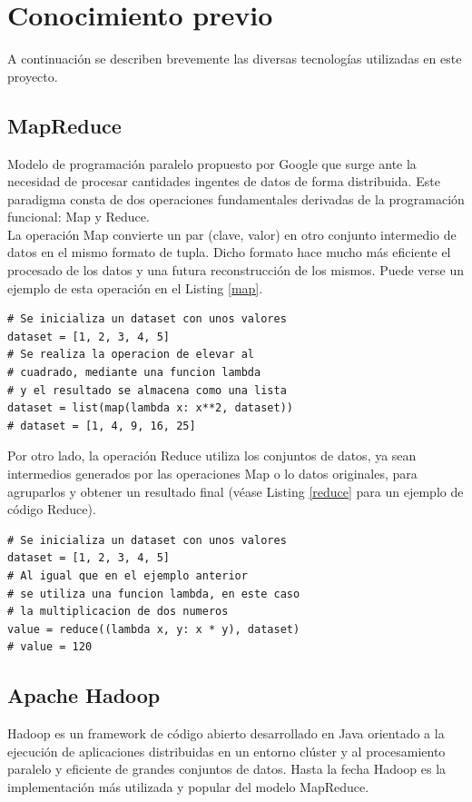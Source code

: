 \documentclass[conference]{IEEEtran}
\begin{document}
\section{Conocimiento previo}

A continuación se describen brevemente las diversas tecnologías utilizadas en este proyecto.

\subsection{MapReduce}
Modelo de programación paralelo propuesto por Google\cite{mapreduce} que surge ante la necesidad de procesar cantidades ingentes de datos de forma distribuida. Este paradigma consta de dos operaciones fundamentales derivadas de la programación funcional: Map y Reduce.\\

La operación Map convierte un par (clave, valor) en otro conjunto intermedio de datos en el mismo formato de tupla. Dicho formato hace mucho más eficiente el procesado de los datos y una futura reconstrucción de los mismos. Puede verse un ejemplo de esta operación en el Listing \ref{map}.\\

\begin{lstlisting}[style=pythonStyle, caption=Ejemplo de operación Map, label=map]
# Se inicializa un dataset con unos valores
dataset = [1, 2, 3, 4, 5]
# Se realiza la operacion de elevar al 
# cuadrado, mediante una funcion lambda
# y el resultado se almacena como una lista
dataset = list(map(lambda x: x**2, dataset))
# dataset = [1, 4, 9, 16, 25]
\end{lstlisting}

Por otro lado, la operación Reduce utiliza los conjuntos de datos, ya sean intermedios generados por las operaciones Map o lo datos originales, para agruparlos y obtener un resultado final (véase Listing \ref{reduce} para un ejemplo de código Reduce).

\begin{lstlisting}[style=pythonStyle, caption=Ejemplo de operación Reduce, label=reduce]
# Se inicializa un dataset con unos valores
dataset = [1, 2, 3, 4, 5]
# Al igual que en el ejemplo anterior 
# se utiliza una funcion lambda, en este caso
# la multiplicacion de dos numeros
value = reduce((lambda x, y: x * y), dataset)
# value = 120
\end{lstlisting}

\subsection{Apache Hadoop}
Hadoop \cite{hadoop} es un framework de código abierto desarrollado en Java orientado a la ejecución de aplicaciones distribuidas en un entorno clúster y al procesamiento paralelo y eficiente de grandes conjuntos de datos. Hasta la fecha Hadoop es la implementación más utilizada y popular del modelo MapReduce.
\end{document}
